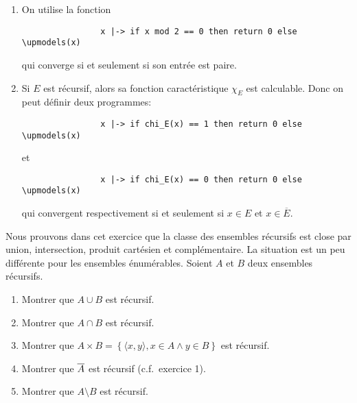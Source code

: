 {\begin{td-sol}[]
\begin{enumerate}
			\item On utilise la fonction
			\begin{verbatim}
				x |-> if x mod 2 == 0 then return 0 else \upmodels(x)
			\end{verbatim}
			qui converge si et seulement si son entrée est paire.

			\item Si \(E\) est récursif, alors sa fonction caractéristique \(\chi_E\) est calculable.
			Donc on peut définir deux programmes:
			\begin{verbatim}
				x |-> if chi_E(x) == 1 then return 0 else \upmodels(x)
			\end{verbatim}
			et
			\begin{verbatim}
				x |-> if chi_E(x) == 0 then return 0 else \upmodels(x)
			\end{verbatim}
			qui convergent respectivement si et seulement si \(x\in E\) et \(x\in \overline{E}\).
		\end{enumerate}
	\end{td-sol}
}{}


\begin{td-exo} %
	Nous prouvons dans cet exercice que la classe des ensembles récursifs est close
	par union, intersection, produit cartésien et complémentaire.
	La situation est un peu différente pour les ensembles énumérables.
	Soient \(A\) et \(B\) deux ensembles récursifs.
	\begin{enumerate}
		\item Montrer que \(A\cup B\) est récursif.
		\item Montrer que \(A\cap B\) est récursif.
		\item Montrer que \(A\times B = \left\{\langle x,y\rangle, x\in A \wedge y\in B\right\}\) est récursif.
		\item Montrer que \(\overline{A}\) est récursif (c.f.\ exercice 1).
		\item Montrer que \(A \setminus B\) est récursif.
	\end{enumerate}
\end{td-exo}

